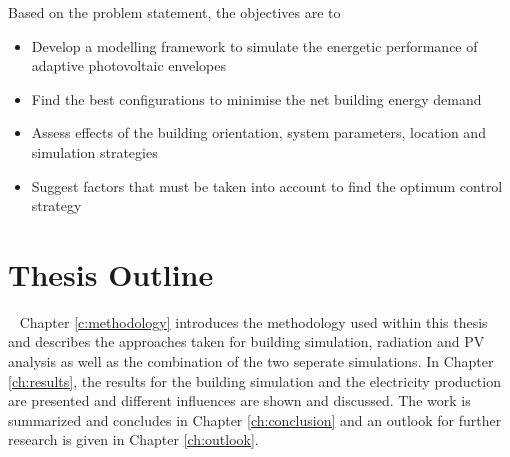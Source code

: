 	Based on the problem statement, the objectives are to

	\begin{itemize}
		\item Develop a modelling framework to simulate the energetic performance of adaptive photovoltaic envelopes
		\item Find the best configurations to minimise the net building energy demand
		\item Assess effects of the building orientation, system parameters, location and simulation strategies
		\item Suggest factors that must be taken into account to find the optimum control strategy
	\end{itemize}


\section{Thesis Outline}\
	Chapter \ref{c:methodology} introduces the methodology used within this thesis and describes the approaches taken for building simulation, radiation and PV analysis as well as the combination of the two seperate simulations. In Chapter \ref{ch:results}, the results for the building simulation and the electricity production are presented and different influences are shown and discussed. The work is summarized and concludes in Chapter \ref{ch:conclusion} and an outlook for further research is given in Chapter \ref{ch:outlook}. 

